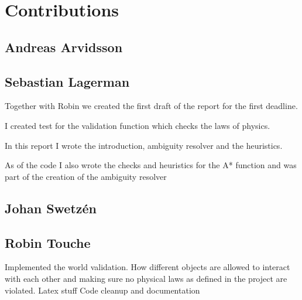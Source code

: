\section*{Contributions}
\subsection*{Andreas Arvidsson}
\subsection*{Sebastian Lagerman}
Together with Robin we created the first draft of the report for the first deadline.

I created test for the validation function which checks the laws of physics.

In this report I wrote the introduction, ambiguity resolver and the heuristics.

As of the code I also wrote the checks and heuristics for the A* function and was part of the creation of the ambiguity resolver

\subsection*{Johan Swetz\'en}
\subsection*{Robin Touche}
Implemented the world validation.
How different objects are allowed to interact with each other and making sure no physical laws as defined in the project are violated.
Latex stuff
Code cleanup and documentation
